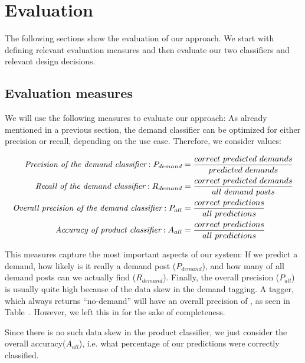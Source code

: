 
\section{Evaluation}
\label{sec:evaluation}

The following sections show the evaluation of our approach.
We start with defining relevant evaluation measures and then evaluate our two classifiers and relevant design decisions.

\subsection{Evaluation measures}
\label{sub:evaluation_measures}
We will use the following measures to evaluate our approach:
As already mentioned in a previous section, the demand classifier can be optimized for either precision or recall, depending on the use case.
Therefore, we consider  values:

\begin{align*}
	\emph{Precision of the demand classifier}: P_{demand} 			&= \frac{correct~predicted~demands}{predicted~demands} \\
	\emph{Recall of the demand classifier}: R_{demand} 				&= \frac{correct~predicted~demands}{all~demand~posts} \\
	\emph{Overall precision of the demand classifier}: P_{all} &= \frac{correct~predictions}{all~predictions} \\
	\emph{Accuracy of product classifier}: A_{all} 						&= \frac{correct~predictions}{all~predictions} \\
\end{align*}

This measures capture the most important aspects of our system: If we predict a demand, how likely is it really a demand post ($P_{demand}$), and how many of all demand posts can we actually find ($R_{demand}$).
Finally, the overall precision ($P_{all}$) is usually quite high because of the data skew in the demand tagging.
A tagger, which always returns ``no-demand'' will have an overall precision of , as seen in Table~.
However, we left this in for the sake of completeness.

Since there is no such data skew in the product classifier, we just consider the overall accuracy($A_{all}$), i.e. what percentage of our predictions were correctly classified.

